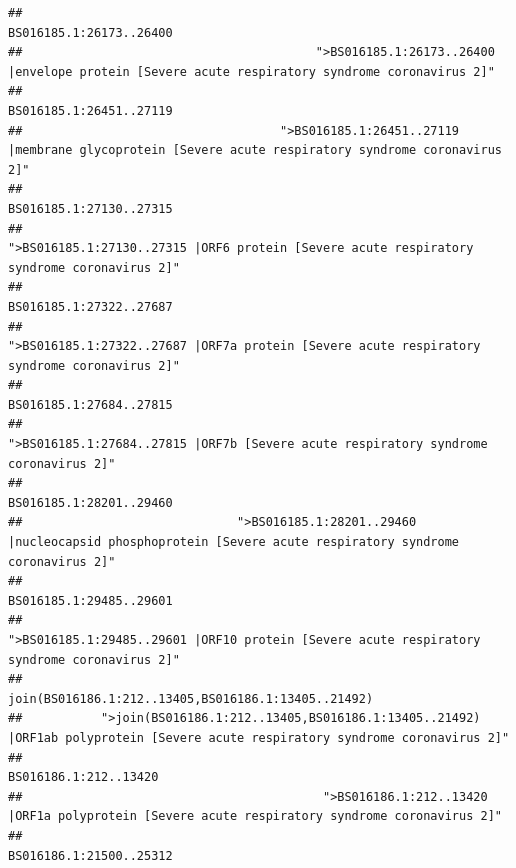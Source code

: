 \documentclass[
]{article}
\begin{document}
\begin{verbatim}
##                                                                                                                BS016185.1:26173..26400 
##                                         ">BS016185.1:26173..26400 |envelope protein [Severe acute respiratory syndrome coronavirus 2]" 
##                                                                                                                BS016185.1:26451..27119 
##                                    ">BS016185.1:26451..27119 |membrane glycoprotein [Severe acute respiratory syndrome coronavirus 2]" 
##                                                                                                                BS016185.1:27130..27315 
##                                             ">BS016185.1:27130..27315 |ORF6 protein [Severe acute respiratory syndrome coronavirus 2]" 
##                                                                                                                BS016185.1:27322..27687 
##                                            ">BS016185.1:27322..27687 |ORF7a protein [Severe acute respiratory syndrome coronavirus 2]" 
##                                                                                                                BS016185.1:27684..27815 
##                                                    ">BS016185.1:27684..27815 |ORF7b [Severe acute respiratory syndrome coronavirus 2]" 
##                                                                                                                BS016185.1:28201..29460 
##                              ">BS016185.1:28201..29460 |nucleocapsid phosphoprotein [Severe acute respiratory syndrome coronavirus 2]" 
##                                                                                                                BS016185.1:29485..29601 
##                                            ">BS016185.1:29485..29601 |ORF10 protein [Severe acute respiratory syndrome coronavirus 2]" 
##                                                                                    join(BS016186.1:212..13405,BS016186.1:13405..21492) 
##           ">join(BS016186.1:212..13405,BS016186.1:13405..21492) |ORF1ab polyprotein [Severe acute respiratory syndrome coronavirus 2]" 
##                                                                                                                  BS016186.1:212..13420 
##                                          ">BS016186.1:212..13420 |ORF1a polyprotein [Severe acute respiratory syndrome coronavirus 2]" 
##                                                                                                                BS016186.1:21500..25312 

\end{verbatim}
\end{document}
